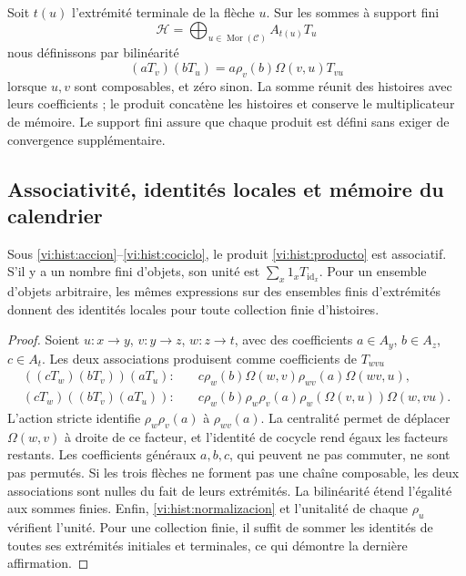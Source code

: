 Soit \(t(u)\) l’extrémité terminale de la flèche \(u\). Sur les sommes
à support fini
\[
 \mathcal H=\bigoplus_{u\in\operatorname{Mor}(\mathcal C)}A_{t(u)}T_u
\]
nous définissons par bilinéarité
\begin{equation}
 (aT_v)(bT_u)=
 a\rho_v(b)\Omega(v,u)T_{vu}
 \label{vi:hist:producto}
\end{equation}
lorsque \(u,v\) sont composables, et zéro sinon. La somme réunit
des histoires avec leurs coefficients ; le produit concatène les histoires et
conserve le multiplicateur de mémoire. Le support fini assure que chaque
produit est défini sans exiger de convergence supplémentaire.

\subsection{Associativité, identités locales et mémoire du calendrier}
\label{vi:hist:asociatividad}

\begin{proposition}
Sous \eqref{vi:hist:accion}--\eqref{vi:hist:cociclo}, le produit
\eqref{vi:hist:producto} est associatif. S’il y a un nombre fini d’objets, son unité
est \(\sum_x1_xT_{\operatorname{id}_x}\). Pour un ensemble d’objets
arbitraire, les mêmes expressions sur des ensembles finis d’extrémités
donnent des identités locales pour toute collection finie d’histoires.
\end{proposition}
\begin{proof}
Soient \(u:x\to y\), \(v:y\to z\), \(w:z\to t\), avec des coefficients
\(a\in A_y\), \(b\in A_z\), \(c\in A_t\). Les deux associations
produisent comme coefficients de \(T_{wvu}\)
\begin{align*}
 ((cT_w)(bT_v))(aT_u):\quad&
 c\rho_w(b)\Omega(w,v)\rho_{wv}(a)\Omega(wv,u),\\
 (cT_w)((bT_v)(aT_u)):\quad&
 c\rho_w(b)\rho_w\rho_v(a)
 \rho_w(\Omega(v,u))\Omega(w,vu).
\end{align*}
L’action stricte identifie \(\rho_w\rho_v(a)\) à
\(\rho_{wv}(a)\). La centralité permet de déplacer
\(\Omega(w,v)\) à droite de ce facteur, et l’identité de cocycle
rend égaux les facteurs restants. Les coefficients généraux
\(a,b,c\), qui peuvent ne pas commuter, ne sont pas permutés. Si les trois flèches ne forment pas une
chaîne composable, les deux associations sont nulles du fait de leurs extrémités.
La bilinéarité étend l’égalité aux sommes finies. Enfin,
\eqref{vi:hist:normalizacion} et l’unitalité de chaque \(\rho_u\)
vérifient l’unité. Pour une collection finie, il suffit de sommer les identités
de toutes ses extrémités initiales et terminales, ce qui démontre la dernière
affirmation.
\end{proof}

